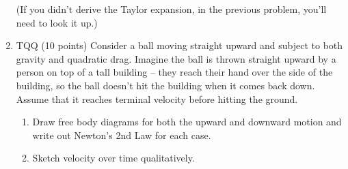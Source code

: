 \documentclass[12pt]{article}
\begin{document}
\begin{enumerate}
        (If you didn't derive the Taylor expansion, in the previous problem, you'll need to look it up.)



  \item TQQ (10 points) Consider a ball moving straight upward and subject to both gravity and quadratic drag. Imagine the ball is thrown straight upward by a person on top of a tall building -- they reach their hand over the side of the building, so the ball doesn't hit the building when it comes back down. Assume that it reaches terminal velocity before hitting the ground.

        \begin{enumerate}
          \item Draw free body diagrams for both the upward and downward motion and write out Newton's 2nd Law for each case.


          \item Sketch velocity over time qualitatively.


\end{enumerate}
\end{enumerate}
\end{document}
